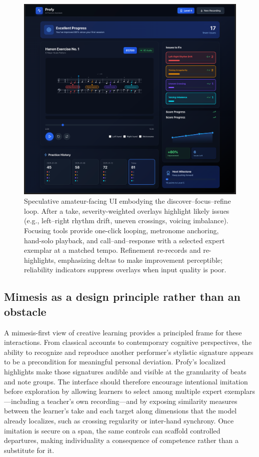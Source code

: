 \documentclass[sigconf,review,anonymous]{acmart}
\begin{document}
\begin{figure}[t]
  \centering
  \includegraphics[width=0.98\linewidth]{figures/future_ui.png}
  \caption{Speculative amateur-facing UI embodying the discover–focus–refine loop. After a take, severity-weighted overlays highlight likely issues (e.g., left–right rhythm drift, uneven crossings, voicing imbalance). Focusing tools provide one-click looping, metronome anchoring, hand-solo playback, and call–and–response with a selected expert exemplar at a matched tempo. Refinement re-records and re-highlights, emphasizing deltas to make improvement perceptible; reliability indicators suppress overlays when input quality is poor.}
  \label{fig:future_ui}
\end{figure}

\subsection{Mimesis as a design principle rather than an obstacle}
A mimesis-first view of creative learning provides a principled frame for these interactions. From classical accounts to contemporary cognitive perspectives, the ability to recognize and reproduce another performer’s stylistic signature appears to be a precondition for meaningful personal deviation. Profy’s localized highlights make those signatures audible and visible at the granularity of beats and note groups. The interface should therefore encourage intentional imitation before exploration by allowing learners to select among multiple expert exemplars—including a teacher’s own recording—and by exposing similarity measures between the learner’s take and each target along dimensions that the model already localizes, such as crossing regularity or inter-hand synchrony. Once imitation is secure on a span, the same controls can scaffold controlled departures, making individuality a consequence of competence rather than a substitute for it.
\end{document}
